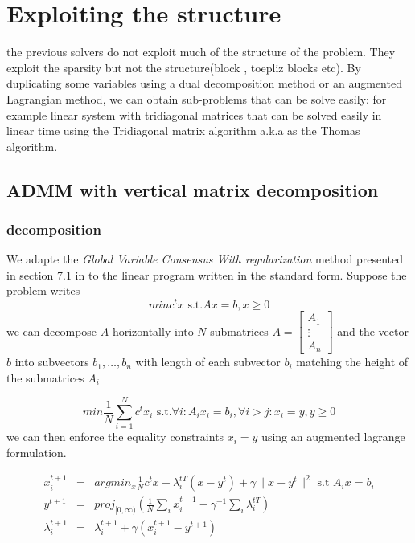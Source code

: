\documentclass[11pt]{article}
\begin{document}
\section{Exploiting the structure}

the previous solvers do not exploit much of the structure of the problem. They exploit the sparsity but not the structure(block , toepliz blocks etc). By duplicating some variables using a dual decomposition method or an augmented Lagrangian method,  we can obtain sub-problems that can be solve easily: for example linear system with tridiagonal matrices 
 that can be solved easily in linear time using the  Tridiagonal matrix algorithm a.k.a as the Thomas algorithm. 



\subsection{ADMM with vertical matrix decomposition}
\subsubsection{decomposition}
We adapte the \textit{Global Variable Consensus With regularization} method  presented in section 7.1 in \cite{Boyd2010} to the linear program written in the standard form.
Suppose the problem writes 
\begin{equation}
min c^t x \text{ s.t.} Ax= b,x \geq 0 
\end{equation}
we can decompose $A$ horizontally into $N$ submatrices 
$A=\left[\begin{array}{c}A_1\\ \vdots\\ A_n\end{array}\right]$ 
and the vector $b$ into subvectors $b_1,\dots,b_n$ with length of each subvector $b_i$ matching the height of the submatrices $A_i$

\begin{equation}
min \frac{1}{N}\sum_{i=1}^N c^t x_i \text{ s.t.} \forall i : A_i x_i= b_i , \forall i>j: x_i=y, y\geq 0
\end{equation}
we can then enforce the equality constraints $x_i=y$ using an augmented lagrange formulation. 

\begin{eqnarray}
x_i^{t+1}&=&argmin_x  \frac{1}{N}c^tx +\lambda_i^{tT} (x-y^t)+\gamma\|x-y^t\|^2 \text{ s.t } A_ix=b_i\\
y^{t+1}&=&proj_{[0,\infty)} (\frac{1}{N}\sum_i x_i^{t+1}-\gamma^{-1} \sum_i \lambda_i^{tT} )\\
\lambda_i^{t+1}&=&\lambda_i^{t+1}+\gamma(x_i^{t+1}-y^{t+1})
\end{eqnarray}
\end{document}
